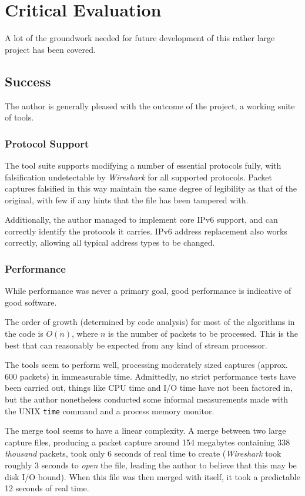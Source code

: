 \documentclass[10pt,a4paper,notitlepage]{report}
\begin{document}
\chapter{Critical Evaluation}
\label{sec:criteval}
A lot of the groundwork needed for future development of this rather large project has been covered.

\section{Success}
The author is generally pleased with the outcome of the project, a working suite of tools.

\subsection{Protocol Support}
The tool suite supports modifying a number of essential protocols fully, with falsification undetectable by \emph{Wireshark} for all supported protocols. Packet captures falsified in this way maintain the same degree of legibility as that of the original, with few if any hints that the file has been tampered with.

Additionally, the author managed to implement core IPv6 support, and can correctly identify the protocols it carries. IPv6 address replacement also works correctly, allowing all typical address types to be changed.

\subsection{Performance}
While performance was never a primary goal, good performance is indicative of good software.

The order of growth (determined by code analysis) for most of the algorithms in the code is $O(n)$, where $n$ is the number of packets to be processed. This is the best that can reasonably be expected from any kind of stream processor.

The tools seem to perform well, processing moderately sized captures (approx. 600 packets) in immeasurable time. Admittedly, no strict performance tests have been carried out, things like CPU time and I/O time have not been factored in, but the author nonetheless conducted some informal measurements made with the UNIX \texttt{time}  command and a process memory monitor.

The merge tool seems to have a linear complexity. A merge between two large capture files, producing a packet capture around 154 megabytes containing 338 \emph{thousand} packets, took only 6 seconds of real time to create (\emph{Wireshark} took roughly 3 seconds to \emph{open} the file, leading the author to believe that this may be disk I/O bound). When this file was then merged with itself, it took a predictable 12 seconds of real time.
\end{document}
